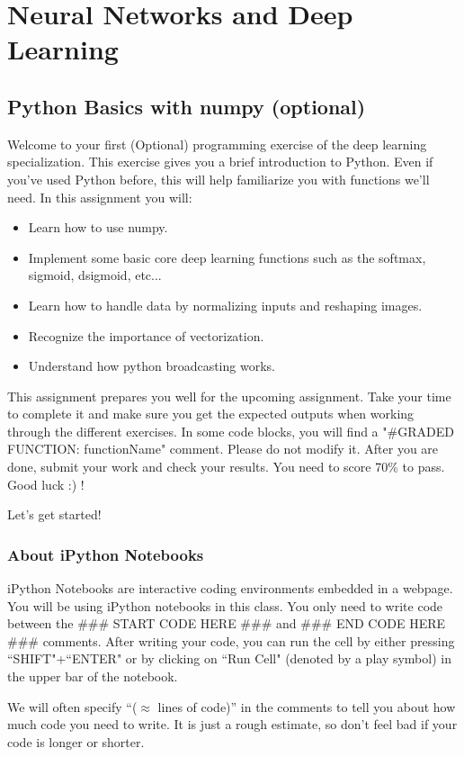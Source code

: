 \section{Neural Networks and Deep Learning}
\subsection{Python Basics with numpy (optional)}

Welcome to your first (Optional) programming exercise of the deep learning specialization. This exercise gives you a brief introduction to Python. Even if you've used Python before, this will help familiarize you with functions we'll need. In this assignment you will:
\begin{itemize}
\item Learn how to use numpy.
\item Implement some basic core deep learning functions such as the softmax, sigmoid, dsigmoid, etc...
\item Learn how to handle data by normalizing inputs and reshaping images.
\item Recognize the importance of vectorization.
\item Understand how python broadcasting works.
\end{itemize}

This assignment prepares you well for the upcoming assignment. Take your time to complete it and make sure you get the expected outputs when working through the different exercises. In some code blocks, you will find a "\#GRADED FUNCTION: functionName" comment. Please do not modify it. After you are done, submit your work and check your results. You need to score 70\% to pass. Good luck :) !

Let's get started!

\subsubsection{About iPython Notebooks}

iPython Notebooks are interactive coding environments embedded in a webpage. You will be using iPython notebooks in this class. You only need to write code between the \#\#\# START CODE HERE \#\#\# and \#\#\# END CODE HERE \#\#\# comments. After writing your code, you can run the cell by either pressing ``SHIFT"+``ENTER" or by clicking on ``Run Cell" (denoted by a play symbol) in the upper bar of the notebook.

We will often specify ``($\approx$ lines of code)'' in the comments to tell you about how much code you need to write. It is just a rough estimate, so don't feel bad if your code is longer or shorter.



